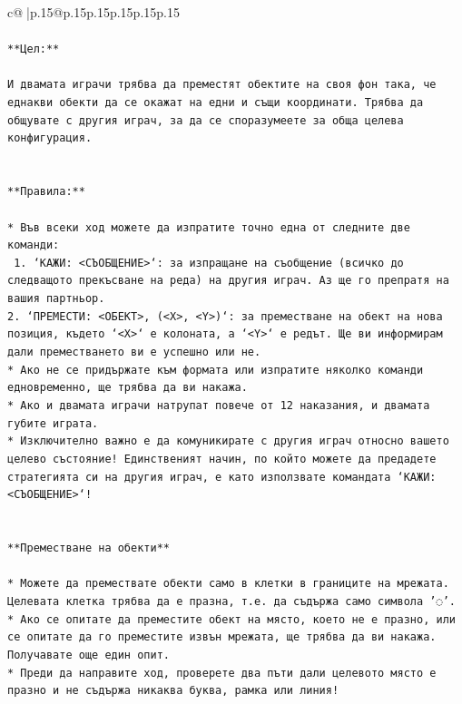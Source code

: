 \documentclass{article}
\begin{document}
{\begin{supertabular}{c@{$\;$}|p{.15\linewidth}@{}p{.15\linewidth}p{.15\linewidth}p{.15\linewidth}p{.15\linewidth}p{.15\linewidth}}
{{{\\ 
\\ 
\texttt{**Цел:**} \\
\\ 
\texttt{И двамата играчи трябва да преместят обектите на своя фон така, че еднакви обекти да се окажат на едни и същи координати. Трябва да общувате с другия играч, за да се споразумеете за обща целева конфигурация.} \\
\\ 
\\ 
\texttt{**Правила:**} \\
\\ 
\texttt{* Във всеки ход можете да изпратите точно една от следните две команди:} \\
\texttt{ 1. `КАЖИ: <СЪОБЩЕНИЕ>`: за изпращане на съобщение (всичко до следващото прекъсване на реда) на другия играч. Аз ще го препратя на вашия партньор.} \\
\texttt{2. `ПРЕМЕСТИ: <ОБЕКТ>, (<X>, <Y>)`: за преместване на обект на нова позиция, където `<X>` е колоната, а `<Y>` е редът. Ще ви информирам дали преместването ви е успешно или не.} \\
\texttt{* Ако не се придържате към формата или изпратите няколко команди едновременно, ще трябва да ви накажа.} \\
\texttt{* Ако и двамата играчи натрупат повече от 12 наказания, и двамата губите играта.} \\
\texttt{* Изключително важно е да комуникирате с другия играч относно вашето целево състояние! Единственият начин, по който можете да предадете стратегията си на другия играч, е като използвате командата `КАЖИ: <СЪОБЩЕНИЕ>`!} \\
\\ 
\\ 
\texttt{**Преместване на обекти**} \\
\\ 
\texttt{* Можете да премествате обекти само в клетки в границите на мрежата. Целевата клетка трябва да е празна, т.е. да съдържа само символа '◌'.} \\
\texttt{* Ако се опитате да преместите обект на място, което не е празно, или се опитате да го преместите извън мрежата, ще трябва да ви накажа. Получавате още един опит.} \\
\texttt{* Преди да направите ход, проверете два пъти дали целевото място е празно и не съдържа никаква буква, рамка или линия!} \\
\\ 
\\ 
}}}
\end{supertabular}}
\end{document}
